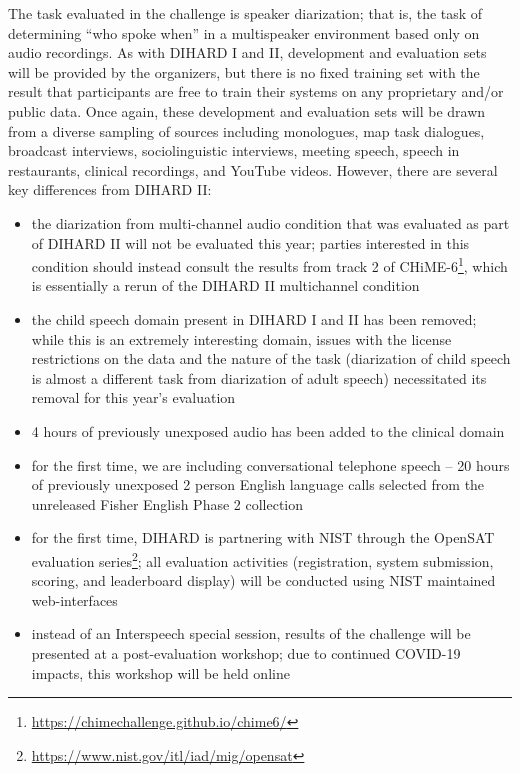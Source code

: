 \documentclass{article}
\begin{document}
The task evaluated in the challenge is speaker diarization; that is, the task of determining ``who spoke when'' in a multispeaker environment based only on audio recordings. As with DIHARD I and II, development and evaluation sets will be provided by the organizers, but there is no fixed training set with the result that participants are free to train their systems on any proprietary and/or public data. Once again, these development and evaluation sets will be drawn from a diverse sampling of sources including monologues, map task dialogues, broadcast interviews, sociolinguistic interviews, meeting speech, speech in restaurants, clinical recordings, and YouTube videos. However, there are several key differences from DIHARD II:
    \begin{itemize}
        \item the diarization from multi-channel audio condition that was evaluated as part of DIHARD II will not be evaluated this year; parties interested in this condition should instead consult the results from track 2 of CHiME-6\footnote{\url{https://chimechallenge.github.io/chime6/}}, which is essentially  a rerun of the DIHARD II multichannel condition
        \item the child speech domain present in DIHARD I and II has been removed; while this is an extremely interesting domain, issues with the license restrictions on the data and the nature of the task (diarization of child speech is almost a different task from diarization of adult speech) necessitated its removal for this year's evaluation
        \item 4 hours of previously unexposed audio has been added to the clinical domain
        \item for the first time, we are including conversational telephone speech  --  20 hours of previously unexposed 2 person English language calls selected from the unreleased Fisher English Phase 2 collection
        \item for the first time, DIHARD is partnering with NIST through the OpenSAT evaluation series\footnote{\url{https://www.nist.gov/itl/iad/mig/opensat}}; all evaluation activities (registration, system submission, scoring, and leaderboard display) will be conducted using NIST maintained web-interfaces
        \item instead of an Interspeech special session, results of the challenge will be presented at a post-evaluation workshop; due to continued COVID-19 impacts, this workshop will be held online
    \end{itemize}
\end{document}
